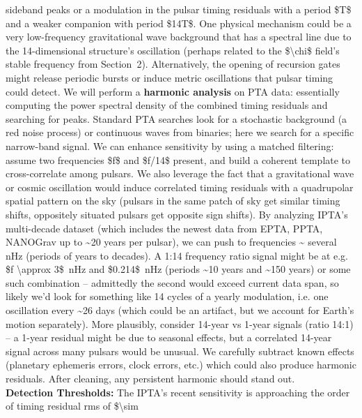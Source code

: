 \documentclass[]{article}
\begin{document}
\begin{enumerate}
  sideband peaks or a modulation in the pulsar timing residuals with a
  period \$T\$ and a weaker companion with period \$14T\$. One physical
  mechanism could be a very low-frequency gravitational wave background
  that has a spectral line due to the 14-dimensional structure's
  oscillation (perhaps related to the \$\textbackslash{}chi\$ field's
  stable frequency from Section~2). Alternatively, the opening of
  recursion gates might release periodic bursts or induce metric
  oscillations that pulsar timing could detect. We will perform a
  \textbf{harmonic analysis} on PTA data​: essentially computing the
  power spectral density of the combined timing residuals and searching
  for peaks. Standard PTA searches look for a stochastic background (a
  red noise process) or continuous waves from binaries; here we search
  for a specific narrow-band signal. We can enhance sensitivity by using
  a matched filtering: assume two frequencies \$f\$ and \$f/14\$
  present, and build a coherent template to cross-correlate among
  pulsars. We also leverage the fact that a gravitational wave or cosmic
  oscillation would induce correlated timing residuals with a
  quadrupolar spatial pattern on the sky​ (pulsars in the same patch of
  sky get similar timing shifts, oppositely situated pulsars get
  opposite sign shifts). By analyzing IPTA's multi-decade dataset (which
  includes the newest data from EPTA, PPTA, NANOGrav up to
  \textasciitilde{}20 years per pulsar), we can push to frequencies
  \textasciitilde{} several nHz (periods of years to decades). A 1:14
  frequency ratio signal might be at e.g. \$f \textbackslash{}approx
  3\$~nHz and \$0.214\$~nHz (periods \textasciitilde{}10 years and
  \textasciitilde{}150 years) or some such combination -- admittedly the
  second would exceed current data span, so likely we'd look for
  something like 14 cycles of a yearly modulation, i.e. one oscillation
  every \textasciitilde{}26 days (which could be an artifact, but we
  account for Earth's motion separately). More plausibly, consider
  14-year vs 1-year signals (ratio 14:1) -- a 1-year residual might be
  due to seasonal effects, but a correlated 14-year signal across many
  pulsars would be unusual. We carefully subtract known effects
  (planetary ephemeris errors, clock errors, etc.) which could also
  produce harmonic residuals​. After cleaning, any persistent harmonic
  should stand out.\\
  \textbf{Detection Thresholds:} The IPTA's recent sensitivity is
  approaching the order of timing residual rms of \$\textbackslash{}sim

\end{enumerate}
\end{document}
